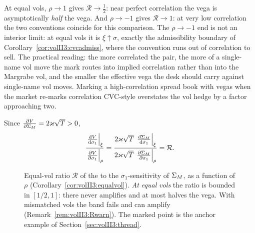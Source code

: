 \begin{remark}[Limits]\label{rem:volII3:limits}
At equal vols, $\rho \to 1$ gives $\mathcal{R} \to \tfrac12$: near perfect
correlation the \stickycvc{} vega is asymptotically \emph{half} the
\stickyrho{} vega. And $\rho \to -1$ gives $\mathcal{R} \to 1$: at very low
correlation the two conventions coincide for this comparison. The
$\rho \to -1$ end is not an interior limit: at equal vols it is $\xi \uparrow
\sigma$, exactly the admissibility boundary of
Corollary~\ref{cor:volII3:cvcadmiss}, where the convention runs out of
correlation to sell. The practical
reading: the more correlated the pair, the more of a single-name vol move the
\stickycvc{} mark routes into implied correlation rather than into the
Margrabe vol, and the smaller the effective vega the desk should carry against
single-name vol moves. Marking a high-correlation spread book with \stickyrho{}
vegas when the market re-marks correlation CVC-style overstates the vol hedge
by a factor approaching two.
\end{remark}

\begin{corollary}\label{cor:volII3:vegaratio}
Since $\frac{\partial V}{\partial \Sigma_M} = 2\varkappa\sqrt{T} > 0$,
\begin{equation}\label{eq:volII3:vegaratio}
\frac{\left.\frac{\mathrm{d} V}{\mathrm{d} \sigma_1}\right|_{\xi}}{\left.\frac{\partial V}{\partial \sigma_1}\right|_{\rho}}
= \frac{2\varkappa\sqrt{T}\,\left.\frac{\mathrm{d} \Sigma_M}{\mathrm{d} \sigma_1}\right|_{\xi}}
       {2\varkappa\sqrt{T}\,\left.\frac{\partial \Sigma_M}{\partial \sigma_1}\right|_{\rho}}
= \mathcal{R} .
\end{equation}
\end{corollary}

\begin{figure}[ht]
\centering
{}
\caption{Equal-vol ratio $\mathcal{R}$ of the \stickycvc{} to the \stickyrho{}
$\sigma_1$-sensitivity of $\Sigma_M$, as a function of $\rho$
(Corollary~\ref{cor:volII3:equalvol}). \emph{At equal vols} the ratio is
bounded in $[1/2, 1]$: there \stickycvc{} never amplifies and at most halves
the vega. With mismatched vols the band fails and \stickycvc{} can amplify
(Remark~\ref{rem:volII3:Rwarn}). The marked point is
the anchor example of Section~\ref{sec:volII3:thread}.}
\label{fig:volII3:ratio}
\end{figure}

